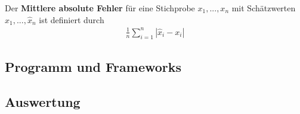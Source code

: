 \begin{definition}
    Der \textbf{Mittlere absolute Fehler} für eine Stichprobe $x_1,...,x_n$
    mit Schätzwerten $\hat{x}_1,...,\hat{x}_n$ ist definiert durch
    \begin{align}
        \frac{1}{n}\sum\limits_{i=1}^{n} | \hat{x}_i-x_i |
    \end{align}
\end{definition}



\subsection{Programm und Frameworks} \label{Programm und Frameworks}



\subsection{Auswertung} \label{Auswertung}
